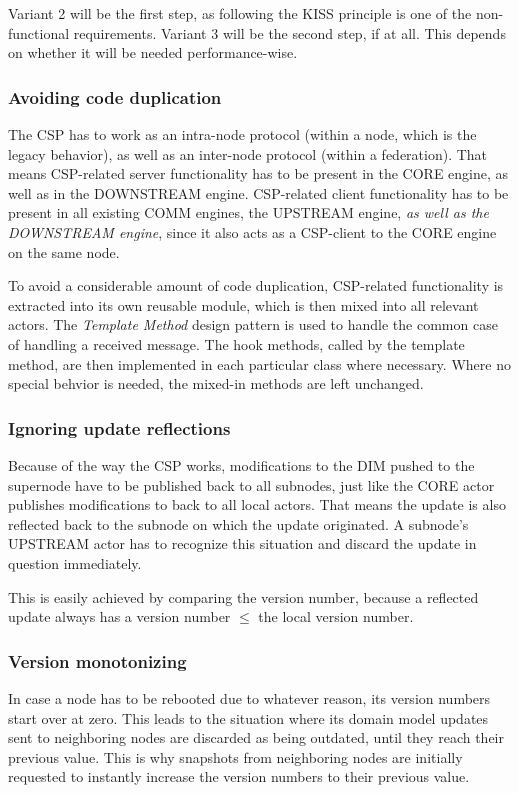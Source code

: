 Variant 2 will be the first step, as following the \gls{KISS} principle is one
of the non-functional requirements. Variant 3 will be the second step, if at
all. This depends on whether it will be needed performance-wise.

\subsubsection{Avoiding code duplication}
The \gls{CSP} has to work as an intra-node protocol (within a node, which is
the legacy behavior), as well as an inter-node protocol (within a federation).
That means \gls{CSP}-related server functionality has to be present in the CORE
engine, as well as in the DOWNSTREAM engine. CSP-related client functionality has
to be present in all existing COMM engines, the UPSTREAM engine, \emph{as well
as the DOWNSTREAM engine}, since it also acts as a CSP-client to the CORE engine on
the same node.

To avoid a considerable amount of code duplication, CSP-related functionality
is extracted into its own reusable module, which is then mixed into all
relevant actors. The \emph{Template Method} design pattern is used to handle
the common case of handling a received
 message. The hook methods,
called by the template method, are then implemented 
in each particular class where necessary. Where no special behvior is needed,
the mixed-in methods are left unchanged.

\subsubsection{Ignoring update reflections}
Because of the way the \gls{CSP} works, modifications to the \gls{DIM} pushed
to the supernode have to be published back to all subnodes, just like the CORE
actor publishes modifications to back to all local actors. That means the update is
also reflected back to the subnode on which the update originated. A subnode's
UPSTREAM actor has to recognize this situation and discard the update in question
immediately.

This is easily achieved by comparing the version number, because a reflected
update always has a version number $\leqslant$ the local version number.

\subsubsection{Version monotonizing}
In case a node has to be rebooted due to whatever reason, its version numbers
start over at zero.
This leads to the situation where its domain model updates sent to neighboring
nodes are discarded as being outdated, until they reach their previous value.
This is why snapshots from neighboring nodes are initially requested to
instantly increase the version numbers to their previous value.

